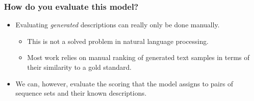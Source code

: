 \documentclass{beamer}
\begin{document}
\begin{frame}
\begin{enumerate}
\begin{itemize}
        \end{itemize}
    \end{enumerate}
\end{frame}

\begin{frame}
    \frametitle{How do you evaluate this model?}
    \begin{itemize}
        \item Evaluating \textit{generated} descriptions can really only be done manually. \pause
            \begin{itemize}
                \item This is not a solved problem in natural language processing.\pause
                \item Most work relies on manual ranking of generated text samples in terms of their similarity to a gold standard.\pause
            \end{itemize}
        \item We can, however, evaluate the scoring that the model assigns to pairs of sequence sets and their known descriptions.
    \end{itemize}
\end{frame}
\end{document}
